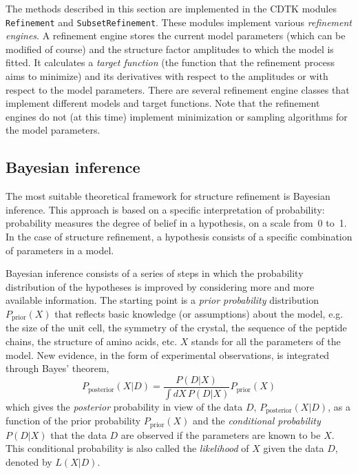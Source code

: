 \documentclass[12pt]{article}
\begin{document}
\begin{sloppy}
The methods described in this section are implemented in the CDTK
modules \texttt{Refinement} and \texttt{SubsetRefinement}. These
modules implement various \textit{refinement engines}. A refinement
engine stores the current model parameters (which can be modified of
course) and the structure factor amplitudes to which the model is
fitted. It calculates a \textit{target function} (the function that
the refinement process aims to minimize) and its derivatives with
respect to the amplitudes or with respect to the model parameters.
There are several refinement engine classes that implement different
models and target functions. Note that the refinement engines
do not (at this time) implement minimization or sampling algorithms
for the model parameters.

\subsection{Bayesian inference}

The most suitable theoretical framework for structure refinement is
Bayesian inference. This approach is based on a specific
interpretation of probability: probability measures the degree of
belief in a hypothesis, on a scale from~0 to~1. In the case of
structure refinement, a hypothesis consists of a specific combination
of parameters in a model.

Bayesian inference consists of a series of steps in which the
probability distribution of the hypotheses is improved by considering
more and more available information. The starting point is a
\textit{prior probability} distribution $P_{\mbox{prior}}(X)$ that
reflects basic knowledge (or assumptions) about the model, e.g. the
size of the unit cell, the symmetry of the crystal, the sequence of
the peptide chains, the structure of amino acids, etc. $X$ stands for
all the parameters of the model. New evidence, in the form of experimental
observations, is integrated through Bayes' theorem,
\begin{equation}
P_{\mbox{posterior}}(X|D) = \frac{P(D|X)}{\int dX\,P(D|X)} P_{\mbox{prior}}(X)
\end{equation}
which gives the \textit{posterior} probability in view of the data
$D$, $P_{\mbox{posterior}}(X|D)$, as a function of the prior probability
$P_{\mbox{prior}}(X)$ and the \textit{conditional probability} $P(D|X)$
that the data $D$ are observed if the parameters are known to be $X$.
This conditional probability is also called the \textit{likelihood}
of $X$ given the data $D$, denoted by $L(X|D)$.


\end{sloppy}
\end{document}
